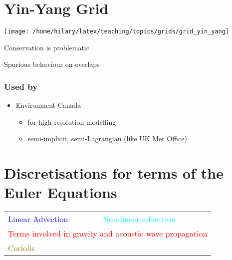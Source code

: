 \begin{minipage}[t][0.5\paperheight]{0.48\columnwidth}%

\section*{Yin-Yang Grid}

\texttt{[image: /home/hilary/latex/teaching/topics/grids/grid\_yin\_yang]}

Conservation is problematic

Spurious behaviour on overlaps%
\end{minipage} \hfill{}%
\begin{minipage}[t]{0.47\columnwidth}%

\subsubsection*{Used by}
\begin{itemize}
\item Environment Canada
\begin{itemize}
\item for high resolution modelling
\item semi-implicit, semi-Lagrangian (like UK Met Office)
\end{itemize}
\end{itemize}
%
\end{minipage}

\clearpage{}

\section*{Discretisations for terms of the Euler Equations}

\begin{tabular}{ll}
\textcolor{blue}{Linear Advection}\hspace{1cm} & \textcolor{cyan}{Non-linear advection}\tabularnewline
\multicolumn{2}{l}{\textcolor{red}{Terms involved in gravity and acoustic wave propagation}}\tabularnewline
\multicolumn{2}{l}{\textcolor{olive}{Coriolis}}\tabularnewline
\end{tabular}

